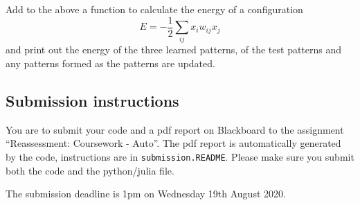 \documentclass[12pt]{article}
\begin{document}
Add to the above a function to calculate the energy of a configuration
\begin{equation}
E=-\frac{1}{2}\sum_{ij} x_i w_{ij} x_j
\end{equation}
and print out the energy of the three learned patterns, of the test
patterns and any patterns formed as the patterns are updated.

\subsection*{Submission instructions}

You are to submit your code and a pdf report on Blackboard to the assignment ``Reassessment: Coursework - Auto''. The pdf report
is automatically generated by the code, instructions are in
\texttt{submission.README}. Please make sure you submit both the code
and the python/julia file.

The submission deadline is 1pm on Wednesday 19th August 2020.
\end{document}
